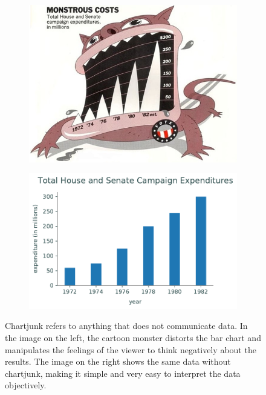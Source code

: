 \begin{figure}[H] %
    \centering
    \begin{subfigure}{.47\textwidth}
        \centering
        \includegraphics[width=\textwidth]{figures/chartjunk1.jpg}
    \end{subfigure}
    \begin{subfigure}{.47\textwidth}
        \centering
        \includegraphics[width=\textwidth]{figures/chartjunk_improved.pdf}
    \end{subfigure}
    \caption{Chartjunk refers to anything that does not communicate data. In the image on the left, the cartoon monster distorts the bar chart and manipulates the feelings of the viewer to think negatively about the results. The image on the right shows the same data without chartjunk, making it simple and very easy to interpret the data objectively.}
    \label{fig:chartjunk}
\end{figure}

